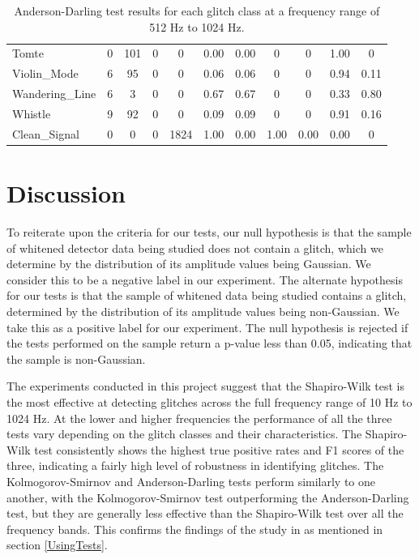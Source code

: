 \documentclass[12pt]{article}
\begin{document}
\begin{table}[H]
\begin{tabular}{lcccccccccc}
  Tomte & 0 & 101 & 0 & 0 & 0.00 & 0.00 & 0 & 0 & 1.00 & 0 \\
  Violin\_Mode & 6 & 95 & 0 & 0 & 0.06 & 0.06 & 0 & 0 & 0.94 & 0.11 \\
  Wandering\_Line & 6 & 3 & 0 & 0 & 0.67 & 0.67 & 0 & 0 & 0.33 & 0.80 \\
  Whistle & 9 & 92 & 0 & 0 & 0.09 & 0.09 & 0 & 0 & 0.91 & 0.16 \\
  Clean\_Signal & 0 & 0 & 0 & 1824 & 1.00 & 0.00 & 1.00 & 0.00 & 0.00 & 0 \\
  \bottomrule
  \end{tabular}
  \caption{Anderson-Darling test results for each glitch class at a frequency range of 512 Hz to 1024 Hz.}
  \label{tab:ad_high_frequency_results}
\end{table}

\section{Discussion}\label{Discussion}

\noindent To reiterate upon the criteria for our tests, our null hypothesis is that the sample of whitened detector data being studied does not contain a glitch, which we determine by the distribution of its amplitude values being Gaussian. We consider this to be a negative label in our experiment. The alternate hypothesis for our tests is that the sample of whitened data being studied contains a glitch, determined by the distribution of its amplitude values being non-Gaussian. We take this as a positive label for our experiment. The null hypothesis is rejected if the tests performed on the sample return a p-value less than 0.05, indicating that the sample is non-Gaussian.

\medskip
\noindent The experiments conducted in this project suggest that the Shapiro-Wilk test is the most effective at detecting glitches across the full frequency range of 10 Hz to 1024 Hz. At the lower and higher frequencies the performance of all the three tests vary depending on the glitch classes and their characteristics. The Shapiro-Wilk test consistently shows the highest true positive rates and F1 scores of the three, indicating a fairly high level of robustness in identifying glitches. The Kolmogorov-Smirnov and Anderson-Darling tests perform similarly to one another, with the Kolmogorov-Smirnov test outperforming the Anderson-Darling test, but they are generally less effective than the Shapiro-Wilk test over all the frequency bands. This confirms the findings of the study in \cite{razali2011power} as mentioned in section \ref{UsingTests}.
\end{document}
